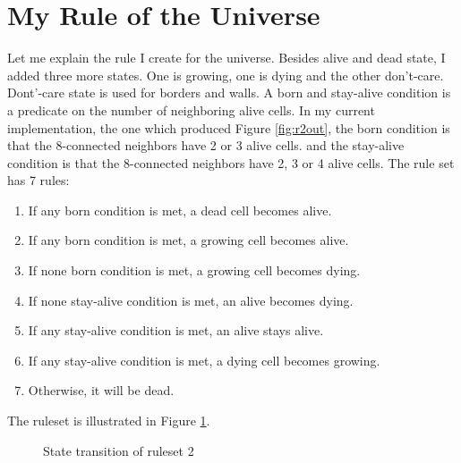 \documentclass[12pt,a4paper]{article}
\begin{document}
\section{My Rule of the Universe}
Let me explain the rule I create for the universe. Besides alive and dead state, I added three more states. One is growing, one is dying and the other don't-care. Dont'-care state is used for borders and walls. A born and stay-alive condition is a predicate on the number of neighboring alive cells. In my current implementation, the one which produced Figure \ref{fig:r2out}, the born condition is that the 8-connected neighbors have 2 or 3 alive cells. and the stay-alive condition is that the 8-connected neighbors have 2, 3 or 4 alive cells.
The rule set has 7 rules:
\begin{enumerate}
\item If any born condition is met, a dead cell becomes alive.
\item If any born condition is met, a growing cell becomes alive.
\item If none born condition is met, a growing cell becomes dying.
\item If none stay-alive condition is met, an alive becomes dying.
\item If any stay-alive condition is met, an alive stays alive.
\item If any stay-alive condition is met, a dying cell becomes growing.
\item Otherwise, it will be dead.
\end{enumerate}
The ruleset is illustrated in Figure \ref{fig:statemachine}.
\begin{figure}[h!]
\caption{\label{fig:statemachine}State transition of ruleset 2}
\end{figure}
\end{document}
